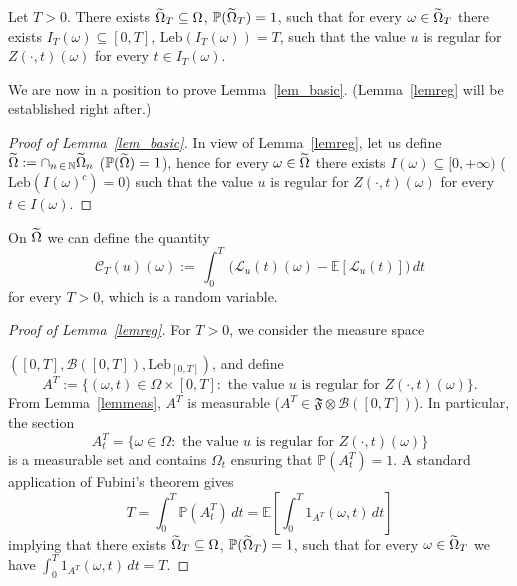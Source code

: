 \documentclass[AHL,Unicode,longabstracts,published]{cedram}
\newcommand{\clC}{\mathcal{C}}
\newcommand{\clL}{\mathcal{L}}
\newcommand{\bbP}{\mathbb{P}}
\newcommand{\bbE}{\mathbb{E}}
\newcommand{\bbN}{\mathbb{N}}
\let\oldtilde\tilde
\renewcommand*{\tilde}[1]{\mathchoice{\widetilde{#1}}{\widetilde{#1}}{\oldtilde{#1}}{\oldtilde{#1}}}
\begin{document}
\begin{lemm}\label{lemreg}
Let $T>0$. There exists $\tilde \Omega_T \subseteq \Omega$, $\bbP(\tilde \Omega_T)=1$, such that for every $\omega\in \tilde\Omega_T$ there exists $I_T(\omega)\subseteq [0,T]$, $\mathrm{Leb} (I_T(\omega))=T$, such that the value $u$ is regular for $Z(\cdot, t)(\omega) $ for every $t\in I_T(\omega)$.
\end{lemm}

We are now in a position to prove Lemma~\ref{lem_basic}. (Lemma~\ref{lemreg} will be established right after.)

\begin{proof}[Proof of Lemma~\ref{lem_basic}]
In view of Lemma~\ref{lemreg}, let us define $\tilde \Omega:=\cap_{n\,\in\,\bbN} \tilde \Omega_n$ ($\bbP(\tilde \Omega)=1$), hence for every $\omega\in \tilde \Omega$ there exists $I(\omega)\subseteq [0,+\infty)$ ($\mathrm{Leb}(I(\omega)^c) = 0$) such that the value $u$ is regular for $ Z(\cdot, t)(\omega)$ for every $t\in I(\omega)$.
\end{proof}

On $\tilde \Omega$ we can define the quantity
\begin{equation*}
\clC_{T}(u)(\omega):=\,\int_{0}^{T}\,\Big(\clL_{u}(t)(\omega)-
\bbE[\clL_{u}(t)]\Big)\,dt
\end{equation*}
for every $T>0$, which is a random variable.

\begin{proof}[Proof of Lemma~\ref{lemreg}]
For $T>0$, we consider the measure space

$([0,T], \mathcal B([0,T]), \text{Leb}_{[0,T]})$, and define
\[
A^T := \{ (\omega, t)\in \Omega \times [0,T] : \text{ the value } u \text{ is regular for } Z(\cdot, t)(\omega)\}.
\]
From Lemma~\ref{lemmeas}, $A^T$ is measurable ($A^T \in \mathfrak F\otimes \mathcal B([0,T])$). In particular, the section
\[
A^T_t = \{ \omega\in \Omega : \text{ the value } u \text{ is regular for } Z(\cdot, t)(\omega)\}
\]
is a measurable set and contains $\Omega_t$ ensuring that $\bbP(A^T_t)=1$. A standard application of Fubini's theorem gives
\begin{equation}\label{meas0}
T = \int_0^T \bbP(A^T_t)\,dt = \mathbb E \left [\int_0^T 1_{A^T}(\omega,t)\,dt
\right]
\end{equation}
implying that there exists $\tilde \Omega_T\subseteq \Omega$, $\bbP(\tilde \Omega_T) =1$, such that for every $\omega\in \tilde \Omega_T$ we have $
\int_0^T 1_{A^T}(\omega,t)\,dt = T. $
\end{proof}
\end{document}
